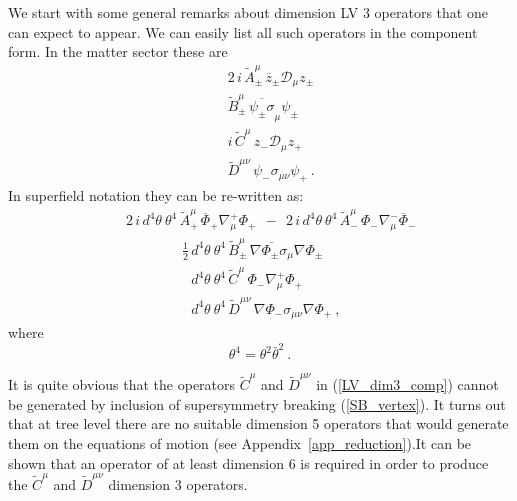 \documentclass[paper,12pt]{revtex4}
\begin{document}
	We start with some general remarks about dimension LV 3 operators 
	that one can expect to appear. 
	We can easily list all such operators in the component form. In the matter sector these
	are
\begin{eqnarray}
\nonumber
	&& 2\, i\, \widetilde{A}_\pm^\mu\, \overline{z}_\pm 
		\mathcal{D}_\mu z_\pm \\
\label{LV_dim3_comp}
	&& \widetilde{B}_\pm^\mu\, \overline{\psi_\pm\sigma}_\mu 
		   		   \psi_\pm \\
\nonumber
	&& i\, \widetilde{C}^\mu\, z_- \mathcal{D}_\mu z_+ \\
\nonumber
	&& \widetilde{D}^{\mu\nu}\, \psi_- \sigma_{\mu\nu} 
		 		    \psi_+~.
\end{eqnarray}
	In superfield notation they can be re-written as:
\begin{eqnarray}
\nonumber
&&
	2\, i\,  d^4\theta~ \theta^4\, \widetilde{A}_+^\mu\, 
	\overline{\Phi}_+ \nabla^+_\mu \Phi_+
	~~-~~
	2\, i\,  d^4\theta~ \theta^4\, \widetilde{A}_-^\mu\, \Phi_- 
	                        \nabla^-_\mu 
		  	  \overline{\Phi}_-  \\
\label{LV_dim3}
&&
	\qquad
	\qquad
	\frac{1}{2}\,
	 d^4\theta~ \theta^4\, \widetilde{B}_\pm^\mu\, 
	\overline{\nabla \Phi_\pm \sigma_\mu} \nabla \Phi_\pm \\
\nonumber
&&
	\qquad
	\qquad
	\phantom{\frac{1}{2}\,}
	d^4\theta~ \theta^4\, \widetilde{C}^\mu\, 
			\Phi_- \nabla_\mu^+ \Phi_+ \\
\nonumber 
&&
	\qquad
	\qquad
	\phantom{\frac{1}{2}\,}
	d^4\theta~ \theta^4\, \widetilde{D}^{\mu\nu}\,
		\nabla \Phi_- \sigma_{\mu\nu} \nabla \Phi_+~, 
\end{eqnarray}
	where
\[
	\theta^4 = \theta^2 \bar\theta^2~.
\]

	It is quite obvious that the operators $ \widetilde{C}^\mu $
	and $ \widetilde{D}^{\mu\nu} $ in (\ref{LV_dim3_comp}) cannot
	be generated by inclusion of supersymmetry breaking (\ref{SB_vertex}). 
	It turns out that at tree level there are no suitable dimension 5 operators
	that would generate them on the equations of motion
	(see Appendix~\ref{app_reduction}).It can be shown that an operator 
    of at least dimension 6 is required 
	in order to produce the $ \widetilde{C}^\mu $
	and $ \widetilde{D}^{\mu\nu} $ dimension 3 operators.
\end{document}
